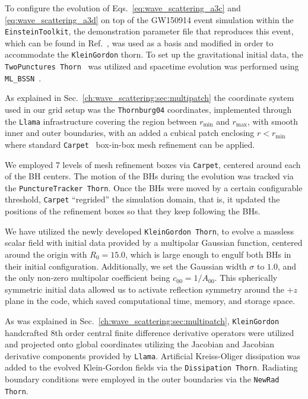 To configure the evolution of Eqs.~\eqref{eq:wave_scattering_a3c} and \eqref{eq:wave_scattering_a3d} on top of the GW150914 event simulation within the \texttt{EinsteinToolkit}, the demonstration parameter file that reproduces this event, which can be found in Ref.~\cite{GW150914Demo}, was used as a basis and modified in order to accommodate the \texttt{KleinGordon} thorn. To set up the gravitational initial data, the \texttt{TwoPunctures Thorn}~\cite{Ansorg:2004ds} was utilized and spacetime evolution was performed using \texttt{ML\_BSSN}~\cite{Brown:2008sb,Kranc:web,McLachlan:web}.

As explained in Sec.~\ref{ch:wave_scattering:sec:multipatch} the coordinate system used in our grid setup was the \texttt{Thornburg04} coordinates, implemented through the \texttt{Llama} infrastructure covering the region between $r_\text{min}$ and $r_\text{max}$, with smooth inner and outer boundaries, with an added a cubical patch enclosing $r < r_\text{min}$ where standard \texttt{Carpet}~\cite{Schnetter:2003rb} box-in-box mesh refinement can be applied.

We employed 7 levels of mesh refinement boxes via \texttt{Carpet}, centered around each of the \ac{BH} centers. The motion of the \acp{BH} during the evolution was tracked via the \texttt{PunctureTracker Thorn}. Once the \acp{BH} were moved by a certain configurable threshold, \texttt{Carpet} ``regrided'' the simulation domain, that is, it updated the positions of the refinement boxes so that they keep following the \acp{BH}.

We have utilized the newly developed \texttt{KleinGordon Thorn}, to evolve a massless scalar field with initial data provided by a multipolar Gaussian function, centered around the origin with $R_0 = 15.0$, which is large enough to engulf both \acp{BH} in their initial configuration. Additionally, we set the Gaussian width $\sigma$ to $1.0$, and the only non-zero multipolar coefficient being $c_{00} = 1 / A_{00}$. This spherically symmetric initial data allowed us to activate reflection symmetry around the $+z$ plane in the code, which saved computational time, memory, and storage space.

As was explained in Sec.~\ref{ch:wave_scattering:sec:multipatch}, \texttt{KleinGordon} handcrafted 8th order central finite difference derivative operators were utilized and projected onto global coordinates utilizing the Jacobian and Jacobian derivative components provided by \texttt{Llama}. Artificial Kreiss-Oliger dissipation was added to the evolved Klein-Gordon fields via the \texttt{Dissipation Thorn}. Radiating boundary conditions were employed in the outer boundaries via the \texttt{NewRad Thorn}.

